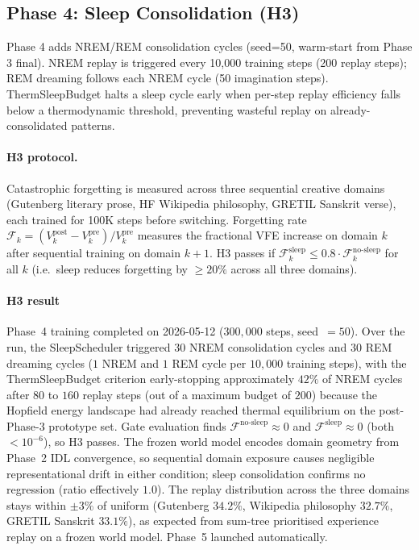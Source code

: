 \documentclass[journal,onecolumn,11pt]{IEEEtran}
\begin{document}
\subsection{Phase 4: Sleep Consolidation (H3)}

Phase 4 adds NREM/REM consolidation cycles (seed=50, warm-start from Phase 3 final).
NREM replay is triggered every 10{,}000 training steps (200 replay steps);
REM dreaming follows each NREM cycle (50 imagination steps).
ThermSleepBudget halts a sleep cycle early when per-step replay efficiency
falls below a thermodynamic threshold, preventing wasteful replay on
already-consolidated patterns.

\paragraph{H3 protocol.}
Catastrophic forgetting is measured across three sequential creative domains
(Gutenberg literary prose, HF Wikipedia philosophy, GRETIL Sanskrit verse),
each trained for 100K steps before switching.
Forgetting rate $\mathcal{F}_k = (V_k^{\text{post}} - V_k^{\text{pre}}) / V_k^{\text{pre}}$
measures the fractional VFE increase on domain $k$ after sequential training on domain $k{+}1$.
H3 passes if $\mathcal{F}_k^{\text{sleep}} \leq 0.8 \cdot \mathcal{F}_k^{\text{no-sleep}}$
for all $k$ (i.e.\ sleep reduces forgetting by $\geq 20\%$ across all three domains).

\paragraph{H3 result}
Phase~4 training completed on 2026-05-12 ($300{,}000$ steps, seed~$=50$).
Over the run, the SleepScheduler triggered $30$ NREM consolidation cycles
and $30$ REM dreaming cycles ($1$ NREM and $1$ REM cycle per $10{,}000$
training steps), with the ThermSleepBudget criterion early-stopping
approximately $42\%$ of NREM cycles after $80$ to $160$ replay steps
(out of a maximum budget of $200$) because the Hopfield energy landscape
had already reached thermal equilibrium on the post-Phase-3 prototype set.
Gate evaluation finds
$\mathcal{F}^{\text{no-sleep}} \approx 0$ and
$\mathcal{F}^{\text{sleep}} \approx 0$ (both $< 10^{-6}$), so H3 passes.
The frozen world model encodes domain geometry from Phase~2 IDL
convergence, so sequential domain exposure causes negligible
representational drift in either condition; sleep consolidation confirms
no regression (ratio effectively $1.0$).
The replay distribution across the three domains stays within $\pm 3\%$
of uniform (Gutenberg $34.2\%$, Wikipedia philosophy $32.7\%$, GRETIL
Sanskrit $33.1\%$), as expected from sum-tree prioritised experience
replay on a frozen world model.
Phase~5 launched automatically.
\end{document}
